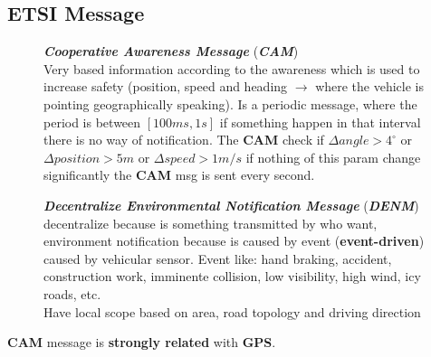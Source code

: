 \subsection{ETSI Message}

\begin{figure}[h]
    \centering
    \begin{minipage}[t]{0.45\textwidth}
        \centering
        \textbf{\textit{Cooperative Awareness Message}} (\textbf{\textit{CAM}}) \\
        Very based information according to the awareness which is used to increase safety (position, speed and heading $\rightarrow$ where the vehicle is pointing geographically speaking). Is a periodic message, where the period is between $[100ms, 1s]$ if something happen in that interval there is no way of notification. The \textbf{CAM} check if $\Delta angle > 4^{\circ}$ or $\Delta position > 5m$ or $\Delta speed > 1m/s$ if nothing of this param change significantly the \textbf{CAM} msg is sent every second. 
    \end{minipage}
    \begin{minipage}[t]{0.45\textwidth}
        \centering
        \textbf{\textit{Decentralize Environmental Notification Message}} (\textbf{\textit{DENM}}) \\
        decentralize because is something transmitted by who want, environment notification because is caused by event (\textbf{event-driven}) caused by vehicular sensor. Event like: hand braking, accident, construction work, imminente collision, low visibility, high wind, icy roads, etc. \\
        Have local scope based on area, road topology and driving direction        
    \end{minipage}
\end{figure}
\textbf{CAM} message is \textbf{strongly related} with \textbf{GPS}.

